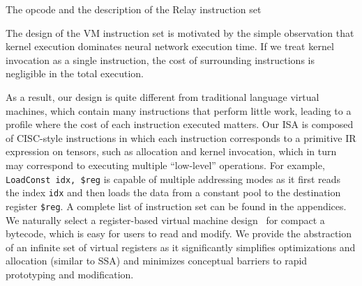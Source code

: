 \begin{table*}[th]
\centering
\small

\caption{The opcode and the description of the Relay instruction set \label{tab:isa}}
\end{table*}


The design of the VM instruction set is motivated by the simple observation that kernel execution dominates neural network execution time. If we treat kernel invocation as a single instruction, the cost of surrounding instructions is negligible in the total execution.

As a result, our design is quite different from traditional language virtual machines, which contain many instructions that perform little work, leading to a profile where the cost of each instruction executed matters.
Our ISA is composed of CISC-style instructions in which each instruction corresponds to a primitive IR expression on tensors, such as allocation and kernel invocation, which in turn may correspond to executing multiple ``low-level'' operations. For example, \texttt{LoadConst idx, \$reg} is capable of multiple addressing modes as it first reads the index \texttt{idx} and then loads the data from a constant pool to the destination register \texttt{\$reg}.
A complete list of instruction set can be found in the appendices.
We naturally select a register-based virtual machine design~\citep{davis2003case} for compact a bytecode, which is easy for users to read and modify. We provide the abstraction of an infinite set of virtual registers as it significantly simplifies optimizations and allocation (similar to SSA) and minimizes conceptual barriers to rapid prototyping and modification.

